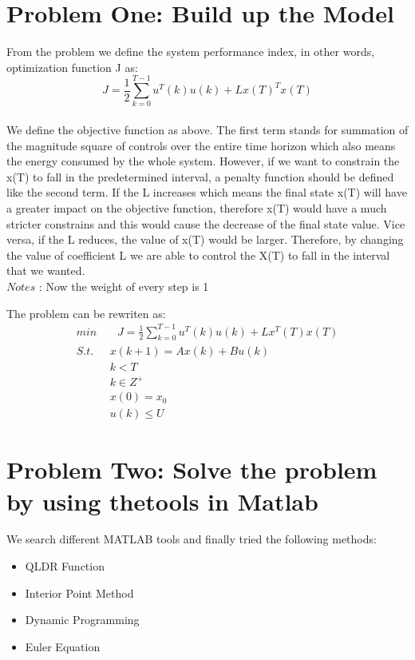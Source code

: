 \documentclass{mcmthesis}
\begin{document}
\section{Problem One: Build up the Model}
From the problem we define the system performance index, in other words, optimization function J as:
$$J=\frac{1}{2}\sum^{T-1}_{k=0}u^T(k)u(k)+Lx(T)^Tx(T)$$
\\  We define the objective function as above. The first term stands for summation of the magnitude square of controls over the entire time horizon which also means the energy consumed by the whole system. However, if we want to constrain the x(T) to fall in the predetermined interval, a penalty function should be defined like the second term. If the L increases which means the final state x(T) will have a greater impact on the objective function, therefore x(T) would have a much stricter constrains and this would cause the decrease of the final state value. Vice versa, if the L reduces, the value of x(T) would be larger.
Therefore, by changing the value of coefficient L we are able to control the X(T) to fall in the interval that we wanted.\\
$Notes$ : Now the weight of every step is 1

The problem can be rewriten as:
\begin{align}
min & \text{ } J=\frac{1}{2}\sum^{T-1}_{k=0}u^T(k)u(k)+Lx^T(T)x(T)\\
S.t. \text{ }& x(k+1)=A x(k)+B u(k)\\ &  k < T\\& k \in Z^+ \\&x(0)=x_0\\&u(k)\leq U
\end{align}


\section{Problem Two: Solve the problem by using thetools in Matlab }
We search different MATLAB tools and finally tried the following methods:

\begin{itemize}

\item QLDR Function
\item Interior Point Method
\item Dynamic Programming 
\item Euler Equation

\end{itemize}
\end{document}
